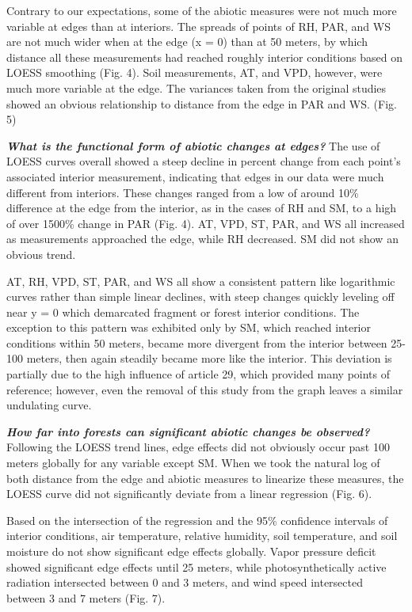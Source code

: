\documentclass[
  man]{apa6}
\begin{document}
Contrary to our expectations, some of the abiotic measures were not much more variable at edges than at interiors. The spreads of points of RH, PAR, and WS are not much wider when at the edge (x = 0) than at 50 meters, by which distance all these measurements had reached roughly interior conditions based on LOESS smoothing (Fig. 4). Soil measurements, AT, and VPD, however, were much more variable at the edge. The variances taken from the original studies showed an obvious relationship to distance from the edge in PAR and WS. (Fig. 5)

\textbf{\emph{What is the functional form of abiotic changes at edges?}} The use of LOESS curves overall showed a steep decline in percent change from each point's associated interior measurement, indicating that edges in our data were much different from interiors. These changes ranged from a low of around 10\% difference at the edge from the interior, as in the cases of RH and SM, to a high of over 1500\% change in PAR (Fig. 4). AT, VPD, ST, PAR, and WS all increased as measurements approached the edge, while RH decreased. SM did not show an obvious trend.

AT, RH, VPD, ST, PAR, and WS all show a consistent pattern like logarithmic curves rather than simple linear declines, with steep changes quickly leveling off near y = 0 which demarcated fragment or forest interior conditions. The exception to this pattern was exhibited only by SM, which reached interior conditions within 50 meters, became more divergent from the interior between 25-100 meters, then again steadily became more like the interior. This deviation is partially due to the high influence of article 29, which provided many points of reference; however, even the removal of this study from the graph leaves a similar undulating curve.

\textbf{\emph{How far into forests can significant abiotic changes be observed?}} Following the LOESS trend lines, edge effects did not obviously occur past 100 meters globally for any variable except SM. When we took the natural log of both distance from the edge and abiotic measures to linearize these measures, the LOESS curve did not significantly deviate from a linear regression (Fig. 6).

Based on the intersection of the regression and the 95\% confidence intervals of interior conditions, air temperature, relative humidity, soil temperature, and soil moisture do not show significant edge effects globally. Vapor pressure deficit showed significant edge effects until 25 meters, while photosynthetically active radiation intersected between 0 and 3 meters, and wind speed intersected between 3 and 7 meters (Fig. 7).
\end{document}
